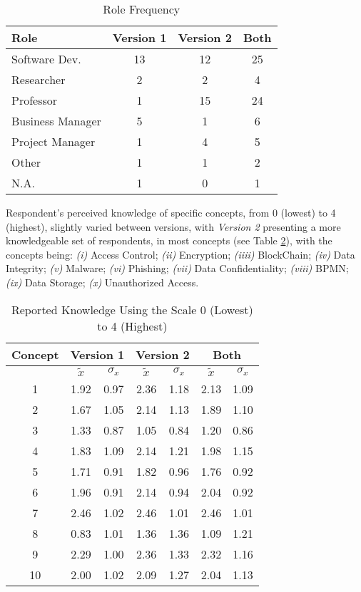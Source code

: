 \begin{table}[htb]
    \centering
    \caption{Role Frequency}
    \label{tab: roles}
    \begin{tabular}{l|cc|c}
    \hline \bf Role & \bf Version 1 & \bf Version 2  & \bf Both \\ \hline
    Software Dev.    & 13 & 12  & 25  \\
    Researcher       & 2 & 2  & 4  \\
    Professor        & 1 & 15 & 24 \\
    Business Manager & 5 & 1  & 6  \\
    Project Manager  & 1 & 4  & 5  \\
    Other            & 1 & 1  & 2  \\
    N.A.             & 1 & 0  & 1  \\
    \hline
    \end{tabular}
\end{table}

Respondent's perceived knowledge of specific concepts, from 0 (lowest) to 4 (highest), slightly varied between versions, with \textit{Version 2} presenting a more knowledgeable set of respondents, in most concepts (see Table \ref{tab: knowledge}), with the concepts being: \emph{(i)} Access Control; \emph{(ii)} Encryption; \emph{(iiii)} BlockChain; \emph{(iv)} Data Integrity; \emph{(v)} Malware; \emph{(vi)} Phishing; \emph{(vii)} Data Confidentiality; \emph{(viii)} BPMN; \emph{(ix)} Data Storage; \emph{(x)} Unauthorized Access.

\begin{table}[htb]
    \centering
    \caption{Reported Knowledge Using the Scale 0 (Lowest) to 4 (Highest)}
    \label{tab: knowledge}
    \begin{tabular}{c|cccc|cc}
    \hline 
    \bf Concept & \multicolumn{2}{c}{\bf Version 1} & \multicolumn{2}{c}{\bf Version 2} \vrule & \multicolumn{2}{c}{\bf Both} \\
    \hline
     & $\tilde{x}$ & $\sigma_{x}$ & $\tilde{x}$ & $\sigma_{x}$ & $\tilde{x}$ & $\sigma_{x}$ \\
    \hline
    1 & 1.92 & 0.97 & 2.36 & 1.18 & 2.13 & 1.09 \\
    2 & 1.67 & 1.05 & 2.14 & 1.13 & 1.89 & 1.10 \\
    3 & 1.33 & 0.87 & 1.05 & 0.84 & 1.20 & 0.86 \\
    4 & 1.83 & 1.09 & 2.14 & 1.21 & 1.98 & 1.15 \\
    5 & 1.71 & 0.91 & 1.82 & 0.96 & 1.76 & 0.92 \\
    6 & 1.96 & 0.91 & 2.14 & 0.94 & 2.04 & 0.92 \\
    7 & 2.46 & 1.02 & 2.46 & 1.01 & 2.46 & 1.01 \\
    8 & 0.83 & 1.01 & 1.36 & 1.36 & 1.09 & 1.21 \\
    9 & 2.29 & 1.00 & 2.36 & 1.33 & 2.32 & 1.16 \\
    10 & 2.00 & 1.02 & 2.09 & 1.27 & 2.04 & 1.13 \\
    \hline
    \end{tabular}
\end{table}

